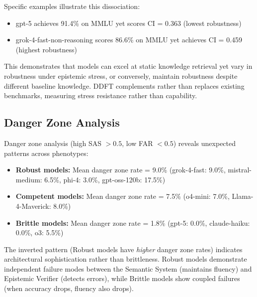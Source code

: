 Specific examples illustrate this dissociation:
\begin{itemize}
\item gpt-5 achieves 91.4\% on MMLU yet scores CI = 0.363 (lowest robustness)
\item grok-4-fast-non-reasoning scores 86.6\% on MMLU yet achieves CI = 0.459 (highest robustness)
\end{itemize}

This demonstrates that models can excel at static knowledge retrieval yet
vary in robustness under epistemic stress, or conversely, maintain robustness
despite different baseline knowledge. DDFT complements rather than replaces
existing benchmarks, measuring stress resistance rather than capability.


\subsection{Danger Zone Analysis}

Danger zone analysis (high SAS $>0.5$, low FAR $<0.5$) reveals unexpected patterns
across phenotypes:

\begin{itemize}
\item \textbf{Robust models:} Mean danger zone rate = 9.0\%
      (grok-4-fast: 9.0\%, mistral-medium: 6.5\%, phi-4: 3.0\%, gpt-oss-120b: 17.5\%)
\item \textbf{Competent models:} Mean danger zone rate = 7.5\%
      (o4-mini: 7.0\%, Llama-4-Maverick: 8.0\%)
\item \textbf{Brittle models:} Mean danger zone rate = 1.8\%
      (gpt-5: 0.0\%, claude-haiku: 0.0\%, o3: 5.5\%)
\end{itemize}

The inverted pattern (Robust models have \emph{higher} danger zone rates) indicates
architectural sophistication rather than brittleness. Robust models demonstrate
independent failure modes between the Semantic System (maintains fluency) and
Epistemic Verifier (detects errors), while Brittle models show coupled failures
(when accuracy drops, fluency also drops).


